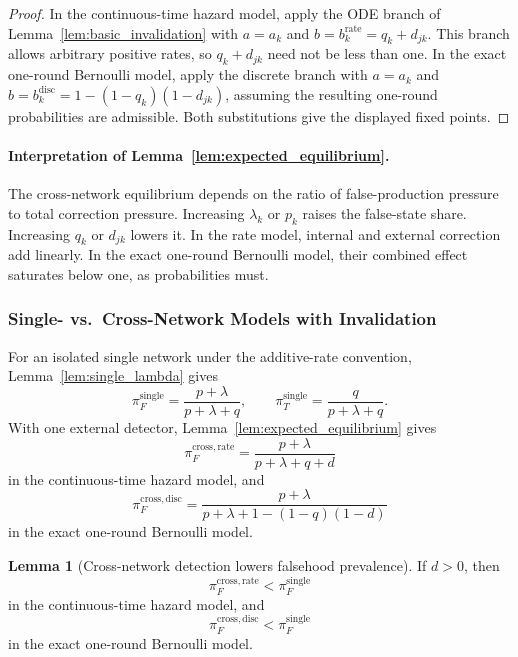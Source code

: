 \documentclass[12pt]{article}
\theoremstyle{definition}
\newtheorem{lemma}{Lemma}[section]
\begin{document}
\begin{proof}
In the continuous-time hazard model, apply the ODE branch of
Lemma~\ref{lem:basic_invalidation} with $a=a_k$ and
$b=b_k^{\mathrm{rate}}=q_k+d_{jk}$.  This branch allows arbitrary positive
rates, so $q_k+d_{jk}$ need not be less than one.  In the exact one-round
Bernoulli model, apply the discrete branch with $a=a_k$ and
$b=b_k^{\mathrm{disc}}=1-(1-q_k)(1-d_{jk})$, assuming the resulting one-round
probabilities are admissible.  Both substitutions give the displayed fixed
points.
\end{proof}

\paragraph{Interpretation of Lemma~\ref{lem:expected_equilibrium}.}
The cross-network equilibrium depends on the ratio of false-production pressure
to total correction pressure.  Increasing $\lambda_k$ or $p_k$ raises the
false-state share.  Increasing $q_k$ or $d_{jk}$ lowers it.  In the rate model,
internal and external correction add linearly.  In the exact one-round Bernoulli
model, their combined effect saturates below one, as probabilities must.


\subsubsection{Single- vs.\ Cross-Network Models with Invalidation}
\label{sec:single-cross-comparison}

For an isolated single network under the additive-rate convention,
Lemma~\ref{lem:single_lambda} gives
\[
\pi_F^{\mathrm{single}}
=
\frac{p+\lambda}{p+\lambda+q},
\qquad
\pi_T^{\mathrm{single}}
=
\frac{q}{p+\lambda+q}.
\]
With one external detector, Lemma~\ref{lem:expected_equilibrium} gives
\[
\pi_F^{\mathrm{cross,rate}}
=
\frac{p+\lambda}{p+\lambda+q+d}
\]
in the continuous-time hazard model, and
\[
\pi_F^{\mathrm{cross,disc}}
=
\frac{p+\lambda}{p+\lambda+1-(1-q)(1-d)}
\]
in the exact one-round Bernoulli model.

\begin{lemma}[Cross-network detection lowers falsehood prevalence]
\label{lem:cross_vs_single}
If $d>0$, then
\[
\pi_F^{\mathrm{cross,rate}}<\pi_F^{\mathrm{single}}
\]
in the continuous-time hazard model, and
\[
\pi_F^{\mathrm{cross,disc}}<\pi_F^{\mathrm{single}}
\]
in the exact one-round Bernoulli model.
\end{lemma}
\end{document}
